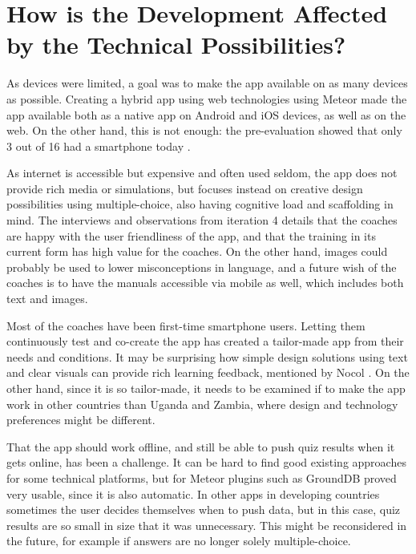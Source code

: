 \section{How is the Development Affected by the Technical Possibilities?}

As devices were limited, a goal was to make the app available on as many devices as possible. Creating a hybrid app using web technologies using Meteor made the app available both as a native app on Android and iOS devices, as well as on the web. On the other hand, this is not enough: the pre-evaluation showed that only 3 out of 16 had a smartphone today \cite{youngdrive-statistics}.

As internet is accessible but expensive and often used seldom, the app does not provide rich media or simulations, but focuses instead on creative design possibilities using multiple-choice, also having cognitive load and scaffolding in mind. The interviews and observations from iteration 4 details that the coaches are happy with the user friendliness of the app, and that the training in its current form has high value for the coaches. On the other hand, images could probably be used to lower misconceptions in language, and a future wish of the coaches is to have the manuals accessible via mobile as well, which includes both text and images.

Most of the coaches have been first-time smartphone users. Letting them continuously test and co-create the app has created a tailor-made app from their needs and conditions. It may be surprising how simple design solutions using text and clear visuals can provide rich learning feedback, mentioned by Nocol \cite{nicol}. On the other hand, since it is so tailor-made, it needs to be examined if to make the app work in other countries than Uganda and Zambia, where design and technology preferences might be different.

That the app should work offline, and still be able to push quiz results when it gets online, has been a challenge. It can be hard to find good existing approaches for some technical platforms, but for Meteor plugins such as GroundDB proved very usable, since it is also automatic. In other apps in developing countries sometimes the user decides themselves when to push data, but in this case, quiz results are so small in size that it was unnecessary. This might be reconsidered in the future, for example if answers are no longer solely multiple-choice.

